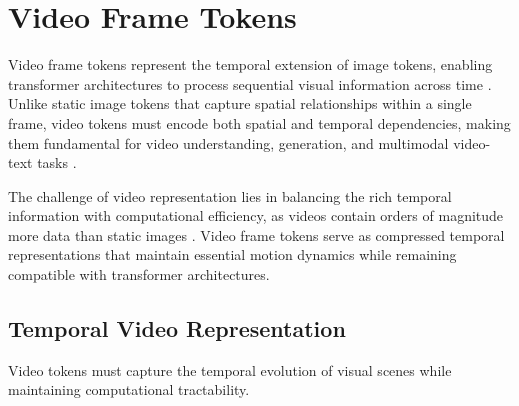 
\section{Video Frame Tokens}

Video frame tokens represent the temporal extension of image tokens, enabling transformer architectures to process sequential visual information across time \citep{zellers2021merlot, zhang2023video}. Unlike static image tokens that capture spatial relationships within a single frame, video tokens must encode both spatial and temporal dependencies, making them fundamental for video understanding, generation, and multimodal video-text tasks \citep{akbari2021vatt}.
\begin{comment}
Feedback: This is a good start. To emphasize the core challenge, you could add: "The primary difficulty in designing video tokens is managing the explosion of data: a few seconds of video can contain hundreds of high-resolution frames. Therefore, the central goal is to create representations that capture the essential motion and semantic changes over time without becoming computationally intractable."
\end{comment}

The challenge of video representation lies in balancing the rich temporal information with computational efficiency, as videos contain orders of magnitude more data than static images \citep{driess2023palm}. Video frame tokens serve as compressed temporal representations that maintain essential motion dynamics while remaining compatible with transformer architectures.

\subsection{Temporal Video Representation}

Video tokens must capture the temporal evolution of visual scenes while maintaining computational tractability.

